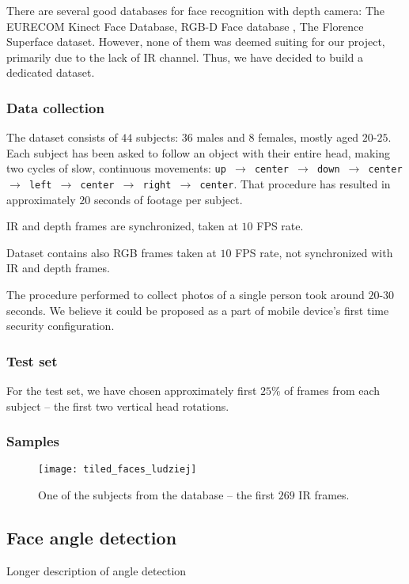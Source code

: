     There are several good databases for face recognition with depth camera:
    The EURECOM Kinect Face Database\cite{eurecom},
    RGB-D Face database \cite{vapaaudk},
    The Florence Superface dataset\cite{superface}. However, none of them was
    deemed suiting for our project, primarily due to the lack of IR channel.
    Thus, we have decided to build a dedicated dataset.

    \subsubsection*{Data collection}
    The dataset consists of $44$ subjects: $36$ males and
    $8$ females, mostly aged $20$-$25$. Each subject has been asked to
    follow an object with their entire head, making two cycles of slow,
    continuous movements: \texttt{up $\to$ center $\to$ down $\to$ center $\to$
    left $\to$ center $\to$ right $\to$ center}.
    That procedure has resulted in approximately $20$ seconds of footage per
    subject.

    IR and depth frames are synchronized, taken at $10$ FPS rate.

    Dataset contains also RGB frames taken at $10$ FPS rate, not synchronized
    with IR and depth frames.

    The procedure performed to collect photos of a single person took around $20$-$30$ seconds.
    We believe it could be proposed as a part of mobile device's first time security configuration.

    \subsubsection*{Test set}
    For the test set, we have chosen approximately first $25\%$ of
    frames from each subject -- the first two vertical head rotations.

    \subsubsection*{Samples}
    \begin{figure}[H]
    \caption{One of the subjects from the database -- the first $269$ IR frames.}
    \centering
    \texttt{[image: tiled\_faces\_ludziej]}
    \end{figure}

    \subsection{Face angle detection}
    \label{sec:angledetection}
    Longer description of angle detection

